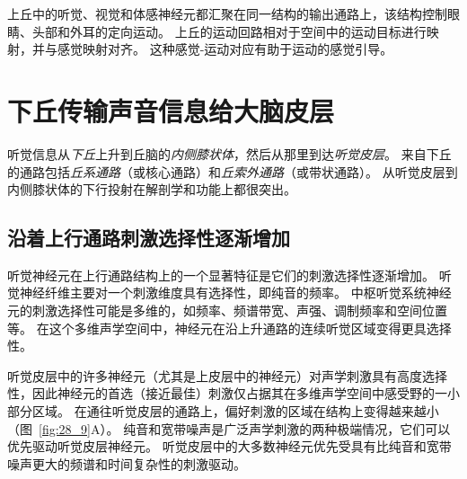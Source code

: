上丘中的听觉、视觉和体感神经元都汇聚在同一结构的输出通路上，该结构控制眼睛、头部和外耳的定向运动。
上丘的运动回路相对于空间中的运动目标进行映射，并与感觉映射对齐。
这种感觉-运动对应有助于运动的感觉引导。



\section{下丘传输声音信息给大脑皮层}

听觉信息从\textit{下丘}上升到丘脑的\textit{内侧膝状体}，然后从那里到达\textit{听觉皮层}。
来自下丘的通路包括\textit{丘系通路}（或核心通路）和\textit{丘索外通路}（或带状通路）。
从听觉皮层到内侧膝状体的下行投射在解剖学和功能上都很突出。



\subsection{沿着上行通路刺激选择性逐渐增加}

听觉神经元在上行通路结构上的一个显著特征是它们的刺激选择性逐渐增加。
听觉神经纤维主要对一个刺激维度具有选择性，即纯音的频率。
中枢听觉系统神经元的刺激选择性可能是多维的，如频率、频谱带宽、声强、调制频率和空间位置等。
在这个多维声学空间中，神经元在沿上升通路的连续听觉区域变得更具选择性。


听觉皮层中的许多神经元（尤其是上皮层中的神经元）对声学刺激具有高度选择性，因此神经元的首选（接近最佳）刺激仅占据其在多维声学空间中感受野的一小部分区域。 
在通往听觉皮层的通路上，偏好刺激的区域在结构上变得越来越小（图~\ref{fig:28_9}A）。
纯音和宽带噪声是广泛声学刺激的两种极端情况，它们可以优先驱动听觉皮层神经元。
听觉皮层中的大多数神经元优先受具有比纯音和宽带噪声更大的频谱和时间复杂性的刺激驱动。


